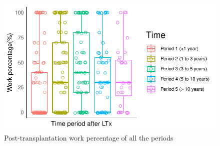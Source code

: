 \documentclass[11pt, a4paper]{article}\usepackage[]{graphicx}\usepackage[]{color}
\makeatletter
\def\maxwidth{ %
  \ifdim\Gin@nat@width>\linewidth
    \linewidth
  \else
    \Gin@nat@width
  \fi
}
\newenvironment{knitrout}{}{} %
\makeatother
\begin{document}
\begin{figure}[ht]
\centering
\begin{knitrout}
\color{fgcolor}
\includegraphics[width=\maxwidth]{plots/pworkperc-1} 

\end{knitrout}
\caption{Post-transplantation work percentage of all the periods}\label{fig:fig7}
\end{figure}
\end{document}
